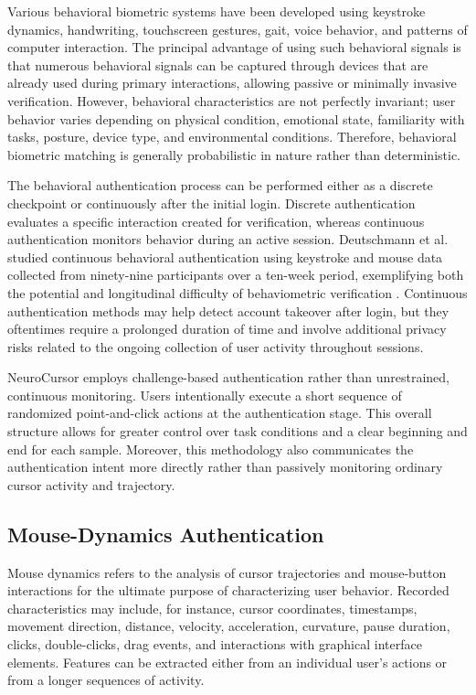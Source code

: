 \documentclass[conference]{IEEEtran}
\begin{document}
Various behavioral biometric systems have been developed using keystroke dynamics, handwriting, touchscreen gestures, gait, voice behavior, and patterns of computer interaction. The principal advantage of using such behavioral signals is that numerous behavioral signals can be captured through devices that are already used during primary interactions, allowing passive or minimally invasive verification. However, behavioral characteristics are not perfectly invariant; user behavior varies depending on physical condition, emotional state, familiarity with tasks, posture, device type, and environmental conditions. Therefore, behavioral biometric matching is generally probabilistic in nature rather than deterministic. 

The behavioral authentication process can be performed either as a discrete checkpoint or continuously after the initial login. Discrete authentication evaluates a specific interaction created for verification, whereas continuous authentication monitors behavior during an active session. Deutschmann et al. studied continuous behavioral authentication using keystroke and mouse data collected from ninety-nine participants over a ten-week period, exemplifying both the potential and longitudinal difficulty of behaviometric verification \cite{deutschmannContinuousAuthentication}. Continuous authentication methods may help detect account takeover after login, but they oftentimes require a prolonged duration of time and involve additional privacy risks related to the ongoing collection of user activity throughout sessions. 

NeuroCursor employs challenge-based authentication rather than unrestrained, continuous monitoring. Users intentionally execute a short sequence of randomized point-and-click actions at the authentication stage. This overall structure allows for  greater control over task conditions and a clear beginning and end for each sample. Moreover, this methodology also communicates the authentication intent more directly rather than passively monitoring ordinary cursor activity and trajectory. 

\subsection{Mouse-Dynamics Authentication}

Mouse dynamics refers to the analysis of cursor trajectories and mouse-button interactions for the ultimate purpose of characterizing user behavior. Recorded characteristics may include, for instance, cursor coordinates, timestamps, movement direction, distance, velocity, acceleration, curvature, pause duration, clicks, double-clicks, drag events, and interactions with graphical interface elements. Features can be extracted either from an individual user's actions or from a longer sequences of activity. 
\end{document}
